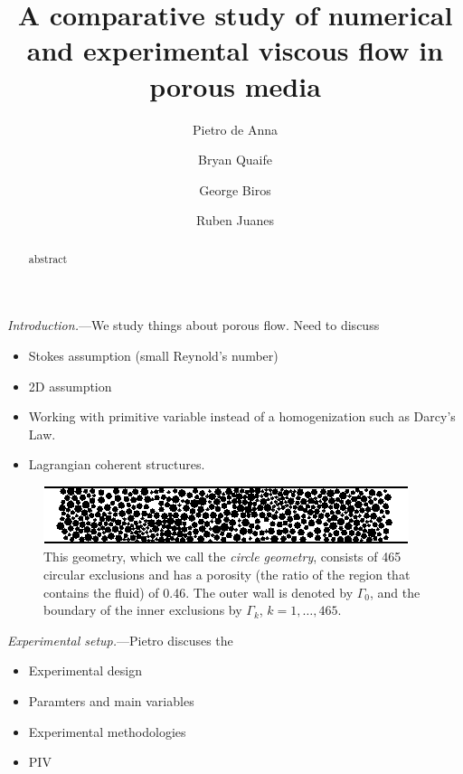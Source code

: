 \documentclass[twocolumn,showpacs,pre,preprintnumbers,floatfix]{revtex4-1}
\newif\ifTikz
\begin{document}
\title{A comparative study of numerical and experimental viscous flow
in porous media}

\author{Pietro de Anna}
\author{Bryan Quaife}
\author{George Biros}
\author{Ruben Juanes}

\begin{abstract}
abstract
\end{abstract}

\maketitle

{\em Introduction.}---We study things about porous flow.  Need to
discuss
\begin{itemize}
  \item Stokes assumption (small Reynold's number)
  \item 2D assumption
  \item Working with primitive variable instead of a homogenization such
  as Darcy's Law.
  \item Lagrangian coherent structures.
\end{itemize}
\begin{figure}[htps]
\ifTikz
  
\else
  \includegraphics{circleGrains.pdf}
\fi
\caption{\label{f:beans} This geometry, which we call the {\em circle
geometry}, consists of 465 circular exclusions and has a porosity (the
ratio of the region that contains the fluid) of 0.46.  The outer wall
is denoted by $\Gamma_{0}$, and the boundary of the inner exclusions by
$\Gamma_{k}$, $k=1,\ldots,465$.}
\end{figure}


{\em Experimental setup.}---Pietro discuses the
\begin{itemize}
  \item Experimental design
  \item Paramters and main variables
  \item Experimental methodologies
  \item PIV
\end{itemize}
\end{document}
